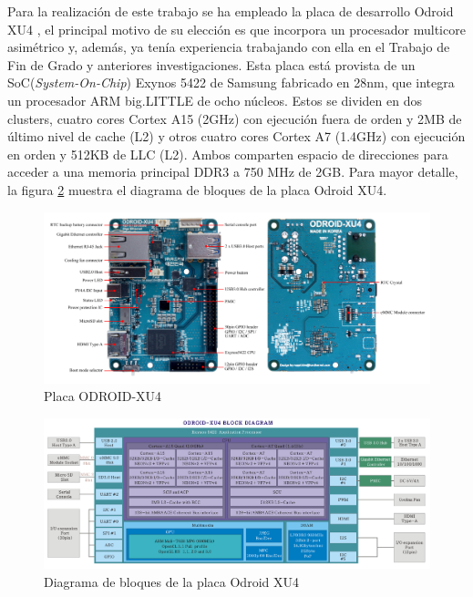 Para la realización de este trabajo se ha empleado la placa de desarrollo Odroid XU4 \cite{odroid-manual}, el principal motivo de su elección es que incorpora un procesador multicore asimétrico y, además, ya tenía experiencia trabajando con ella en el Trabajo de Fin de Grado y anteriores investigaciones. Esta placa está provista de un SoC(\emph{System-On-Chip}) Exynos 5422 de Samsung fabricado en 28nm, que integra un procesador ARM big.LITTLE de ocho núcleos. Estos se dividen en dos clusters, cuatro cores Cortex A15 (2GHz) con ejecución fuera de orden y 2MB de último nivel de cache (L2) y otros cuatro cores Cortex A7 (1.4GHz) con ejecución en orden y 512KB de LLC (L2). Ambos comparten espacio de direcciones para acceder a una memoria principal DDR3 a 750 MHz de 2GB. Para mayor detalle, la figura \ref{fig:diagramaDeBloquesXU4} muestra el diagrama de bloques de la placa Odroid XU4.

\begin{figure}[tbp]
    \centering
    \includegraphics[width=1\textwidth]{foto_placa_XU4.png}
    \caption{Placa ODROID-XU4}
    \label{fig:fotoPlacaXU4}
\end{figure}

\begin{figure}[tbp]
    \centering
    \includegraphics[width=1\textwidth]{diagrama_de_bloques_ODROID_XU4.png}
    \caption{Diagrama de bloques de la placa Odroid XU4}
    \label{fig:diagramaDeBloquesXU4}
\end{figure}




